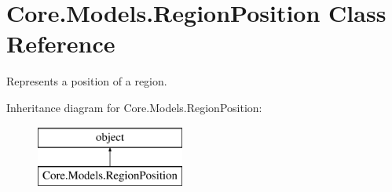 \hypertarget{classCore_1_1Models_1_1RegionPosition}{}\section{Core.\+Models.\+Region\+Position Class Reference}
\label{classCore_1_1Models_1_1RegionPosition}


Represents a position of a region.  


Inheritance diagram for Core.\+Models.\+Region\+Position\+:\begin{figure}[H]
\begin{center}
\leavevmode
\includegraphics[height=2.000000cm]{classCore_1_1Models_1_1RegionPosition}
\end{center}
\end{figure}
